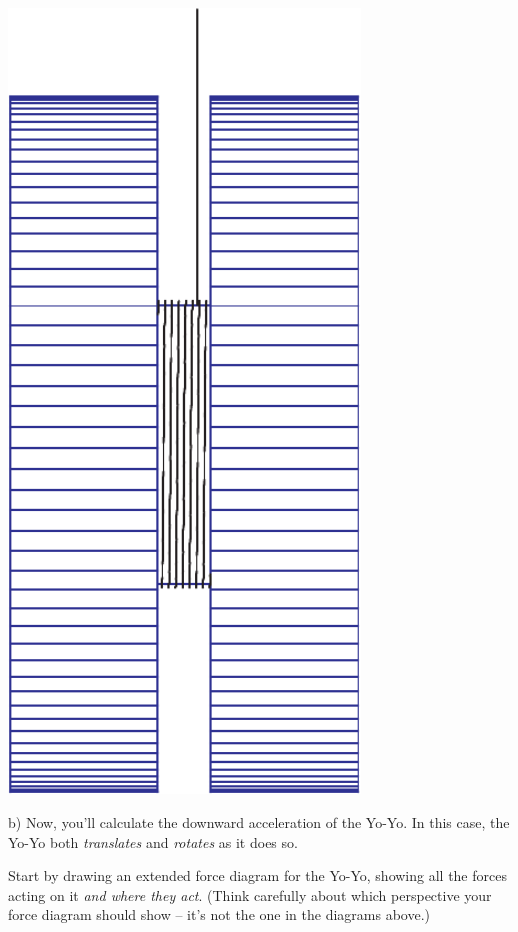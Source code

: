 \documentclass[12pt]{article}
\begin{document}
\begin{minipage}{0.20\textwidth}
		\begin{center}
		\includegraphics[width=0.7\textwidth]{blue-crop.pdf}
			\end{center}
\end{minipage}


\vspace{1.5in}

b) Now, you'll calculate the downward acceleration of the Yo-Yo. In this case, the Yo-Yo both {\it translates} and {\it rotates} as it does so.

Start by drawing an extended force diagram for the Yo-Yo, showing all the forces acting on it {\it and where they act}. (Think carefully about which perspective your force diagram should show -- it's not the one in the diagrams above.)
\end{document}
